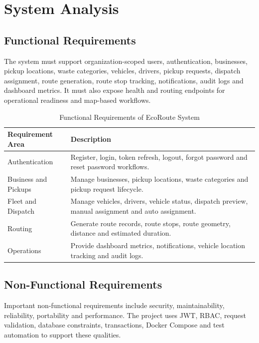 \documentclass[12pt,a4paper]{report}
\newcommand{\chapterheader}{CHAPTER HEADING}
\begin{document}
\renewcommand{\chapterheader}{CHAPTER 3}
\chapter{System Analysis}
\section{Functional Requirements}
The system must support organization-scoped users, authentication, businesses, pickup locations, waste categories, vehicles, drivers, pickup requests, dispatch assignment, route generation, route stop tracking, notifications, audit logs and dashboard metrics. It must also expose health and routing endpoints for operational readiness and map-based workflows.

\begin{table}[h!]
\centering
\caption{Functional Requirements of EcoRoute System}
\begin{tabular}{|p{1.8in}|p{3.6in}|}
\hline
\textbf{Requirement Area} & \textbf{Description}\\ \hline
Authentication & Register, login, token refresh, logout, forgot password and reset password workflows.\\ \hline
Business and Pickups & Manage businesses, pickup locations, waste categories and pickup request lifecycle.\\ \hline
Fleet and Dispatch & Manage vehicles, drivers, vehicle status, dispatch preview, manual assignment and auto assignment.\\ \hline
Routing & Generate route records, route stops, route geometry, distance and estimated duration.\\ \hline
Operations & Provide dashboard metrics, notifications, vehicle location tracking and audit logs.\\ \hline
\end{tabular}
\end{table}

\section{Non-Functional Requirements}
Important non-functional requirements include security, maintainability, reliability, portability and performance. The project uses JWT, RBAC, request validation, database constraints, transactions, Docker Compose and test automation to support these qualities.
\end{document}
